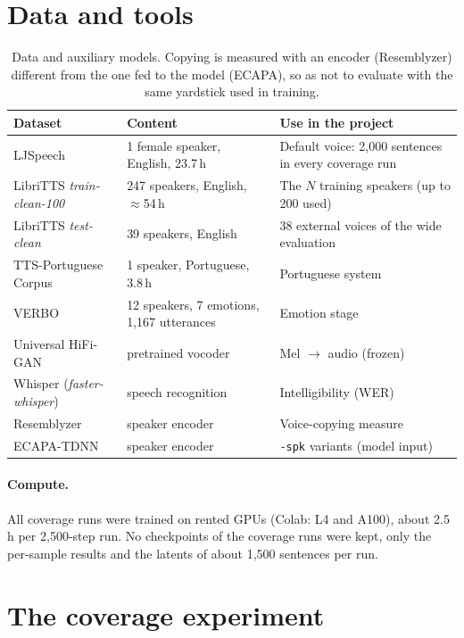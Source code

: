 \documentclass[a4paper,11pt]{article}
\begin{document}
\section{Data and tools}

\begin{table}[H]
\centering\small
\begin{tabular}{@{}p{3.6cm}p{4.4cm}p{7.6cm}@{}}
\toprule
Dataset & Content & Use in the project\\
\midrule
LJSpeech & 1 female speaker, English, 23.7\,h & Default voice: 2,000 sentences in every coverage run\\
LibriTTS \textit{train-clean-100} & 247 speakers, English, $\approx$54\,h & The $N$ training speakers (up to 200 used)\\
LibriTTS \textit{test-clean} & 39 speakers, English & 38 external voices of the wide evaluation\\
TTS-Portuguese Corpus & 1 speaker, Portuguese, 3.8\,h & Portuguese system\\
VERBO & 12 speakers, 7 emotions, 1,167 utterances & Emotion stage\\
\midrule
Universal HiFi-GAN & pretrained vocoder & Mel $\rightarrow$ audio (frozen)\\
Whisper (\textit{faster-whisper}) & speech recognition & Intelligibility (WER)\\
Resemblyzer & speaker encoder & Voice-copying measure\\
ECAPA-TDNN & speaker encoder & \texttt{-spk} variants (model input)\\
\bottomrule
\end{tabular}
\caption{Data and auxiliary models. Copying is measured with an encoder (Resemblyzer) different from the one fed to the model (ECAPA), so as not to evaluate with the same yardstick used in training.}
\end{table}

\paragraph{Compute.} All coverage runs were trained on rented GPUs (Colab: L4 and A100), about 2.5\,h per 2,500-step run. No checkpoints of the coverage runs were kept, only the per-sample results and the latents of about 1,500 sentences per run.

\section{The coverage experiment}
\end{document}
